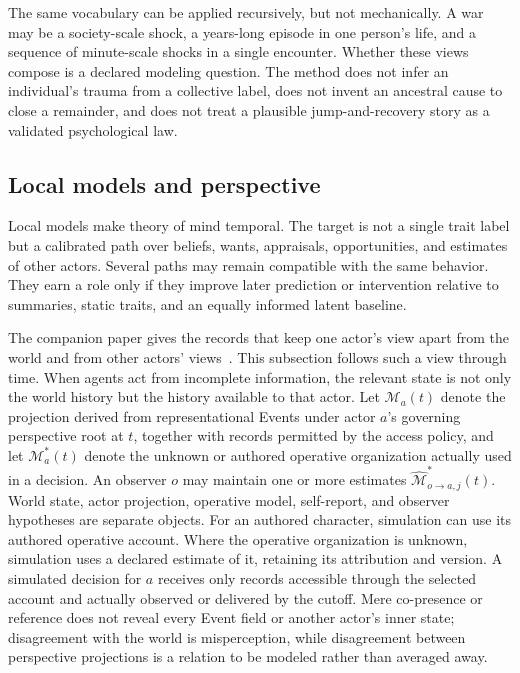 \documentclass[10pt]{article}
\begin{document}
The same vocabulary can be applied recursively, but not mechanically. A war
may be a society-scale shock, a years-long episode in one person's life, and a
sequence of minute-scale shocks in a single encounter. Whether these views
compose is a declared modeling question. The method does not infer an
individual's trauma from a collective label, does not invent an ancestral cause
to close a remainder, and does not treat a plausible jump-and-recovery story as
a validated psychological law.

\subsection{Local models and perspective}
\label{sec:local-models}

Local models make theory of mind temporal. The target is not a single trait label but
a calibrated path over beliefs, wants, appraisals, opportunities, and estimates
of other actors. Several paths may remain compatible with the same behavior.
They earn a role only if they improve later prediction or intervention relative
to summaries, static traits, and an equally informed latent baseline.

The companion paper gives the records that keep one actor's view apart from the world
and from other actors' views~\cite{westerbergMeaning2026}. This subsection follows
such a view through time. When agents
act from incomplete information, the relevant state is not only
the world history but the history available to that actor. Let
$\mathcal M_a(t)$ denote the projection derived from representational Events
under actor $a$'s governing perspective root at $t$, together with records
permitted by the access policy,
and let $\mathcal M_a^*(t)$ denote the unknown or authored operative organization
actually used in a decision. An observer $o$ may maintain one or more estimates
$\widehat{\mathcal M}^{*}_{o\rightarrow a,j}(t)$. World state, actor projection,
operative model, self-report, and observer hypotheses are separate objects.
For an authored character, simulation can use its authored operative account.
Where the operative organization is unknown, simulation uses a declared
estimate of it, retaining its attribution and version. A simulated decision
for $a$ receives only records accessible through the selected account and
actually observed or delivered by the cutoff. Mere
co-presence or reference does not reveal every Event field or another actor's
inner state; disagreement with the world is misperception, while
disagreement between perspective projections is a relation to be modeled rather than averaged
away.
\end{document}
